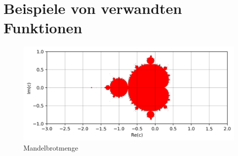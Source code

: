 %
%
%
\section{Beispiele von verwandten Funktionen
\label{logistic:section:beispiele}}
\begin{figure}[h!]
    \includegraphics[width=\linewidth]{papers/logistic/figures/mandel.png}
    \caption{Mandelbrotmenge}
    \label{fig:mandel_2d}
\end{figure}
